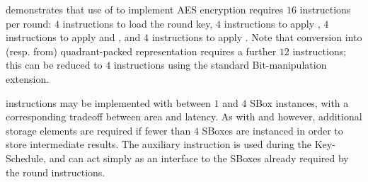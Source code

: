 demonstrates that use of 
to implement AES encryption requires
$16$ instructions per round:
$ 4$ 
     instructions to load the round key,
$ 4$ 
     instructions to apply ,
$ 4$ 
     instructions to apply  and ,
     and
$ 4$ 
     instructions to apply .
Note that conversion into (resp. from) quadrant-packed representation
requires a further
$12$ instructions;
     this can be reduced to
$ 4$ 
     instructions using the 
     standard 
     Bit-manipulation ~\cite[Section 17]{RV:ISA:I:19}
     extension.

 instructions may be implemented with between $1$ and $4$
SBox instances, with a corresponding tradeoff between area and
latency.
As with  and  however, additional storage elements
are required if fewer than $4$ SBoxes are instanced in order to
store intermediate results.
The auxiliary  instruction is used during the
Key-Schedule, and can act simply as an interface to the SBoxes
already required by the round instructions.


